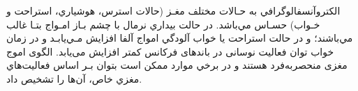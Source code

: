 الكتروآنسفالوگرافي به حـالات مختلف مغـز (حالات استرس، هوشياري، استراحت و خـواب) حسـاس مي‌باشد. در حالت بيداري نرمال با چشم بـاز امـواج بتـا غالب مي‌باشند؛ و در حالت استراحت يا خواب آلودگي امواج آلفا افزايش مـي‌يابـد و در زمان خواب توان فعالیت نوسانی در باندهای فرکانس کمتر افزایش می‌یابد.
 الگوی اموج مغزی منحصربه‌فرد هستند و در برخي موارد ممكن است بتوان بـر اساس فعاليت‌هاي مغزي خاص، آن‌ها را تشخيص داد.
